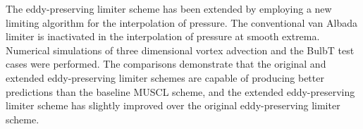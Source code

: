 The eddy-preserving limiter scheme has been extended by employing a new limiting algorithm for the interpolation of pressure. The conventional van Albada limiter is inactivated in the interpolation of pressure at smooth extrema. Numerical simulations of three dimensional vortex advection and the BulbT test cases were performed. The comparisons demonstrate that the original and extended eddy-preserving limiter schemes are capable of producing better predictions than the baseline MUSCL scheme, and the extended eddy-preserving limiter scheme has slightly improved over the original eddy-preserving limiter scheme.